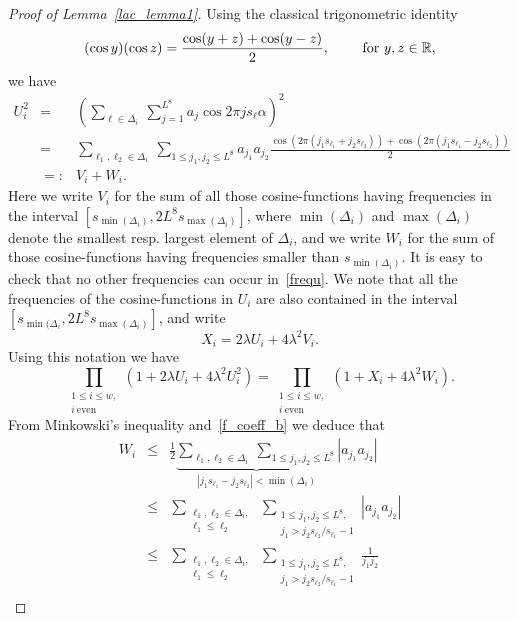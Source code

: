 \documentclass[12pt]{amsart}
\begin{document}
\begin{proof}[Proof of Lemma~\ref{lac_lemma1}]
Using the classical trigonometric identity
\begin{equation}\label{trigid}
(\cos y)(\cos z) = \frac{\cos (y+z) + \cos (y-z)}{2}, \qquad \textrm{ for $y,z \in \mathbb{R}$,}
\end{equation}
we have
\begin{eqnarray}
U_i^2 & = & \left( \sum_{\ell \in \Delta_i} ~\sum_{j=1}^{L^8} a_j \cos 2 \pi j s_\ell \alpha \right)^2 \nonumber\\
& = & \sum_{\ell_1,\ell_2 \in \Delta_i} ~\sum_{1 \leq j_1, j_2 \leq L^8} a_{j_1} a_{j_2} \frac{\cos ( 2 \pi (j_1 s_{\ell_1} + j_2 s_{\ell_2})) + \cos ( 2 \pi (j_1 s_{\ell_1} - j_2 s_{\ell_2}))}{2} \label{frequ}\\
& =: & V_i + W_i. \label{viwi}
\end{eqnarray}
Here we write $V_i$ for the sum of all those cosine-functions having frequencies in the interval $\left[ s_{\min(\Delta_i)}, 2 L^8 s_{\max (\Delta_i)}\right]$, where $\min(\Delta_i)$ and $\max(\Delta_i)$ denote the smallest resp. largest element of $\Delta_i$, and we write $W_i$ for the sum of those cosine-functions having frequencies smaller than $s_{\min(\Delta_i)}$. It is easy to check that no other frequencies can occur in~\eqref{frequ}. We note that all the frequencies of the cosine-functions in $U_i$ are also contained in the interval $\left[s_{\min(\Delta_i}, 2 L^8 s_{\max(\Delta_i)} \right]$, and write
\begin{equation} \label{xiuivi}
X_i = 2 \lambda U_i + 4 \lambda^2 V_i.
\end{equation}
Using this notation we have
$$
\prod_{\substack{1 \leq i \leq w,\\ i ~\textrm{even}}} \left( 1 + 2 \lambda U_i + 4 \lambda^2 U_i^2 \right) = \prod_{\substack{1 \leq i \leq w,\\ i ~\textrm{even}}} \left( 1 + X_i + 4 \lambda^2 W_i \right).
$$
From Minkowski's inequality and~\eqref{f_coeff_b} we deduce that
\begin{eqnarray}
W_i & \leq & \frac{1}{2} \underbrace{\sum_{\ell_1, \ell_2 \in \Delta_i}  ~\sum_{1 \leq j_1,j_2 \leq L^8}}_{|j_1 s_{\ell_1} - j_2 s_{\ell_2}| < \min(\Delta_i)} |a_{j_1} a_{j_2}| \nonumber\\
& \leq & \sum_{\substack{\ell_1, \ell_2 \in \Delta_i,\\ \ell_1 \leq \ell_2}}  ~\sum_{\substack{1 \leq j_1,j_2 \leq L^8,\\ j_1 > j_2 s_{\ell_2} / s_{\ell_1} - 1}} |a_{j_1} a_{j_2}| \label{wi1}\\
& \leq & \sum_{\substack{\ell_1, \ell_2 \in \Delta_i,\\ \ell_1 \leq \ell_2}}  ~\sum_{\substack{1 \leq j_1,j_2 \leq L^8,\\ j_1 > j_2 s_{\ell_2} / s_{\ell_1} - 1}} \frac{1}{j_1 j_2} \nonumber\\

\end{eqnarray}
\end{proof}
\end{document}
